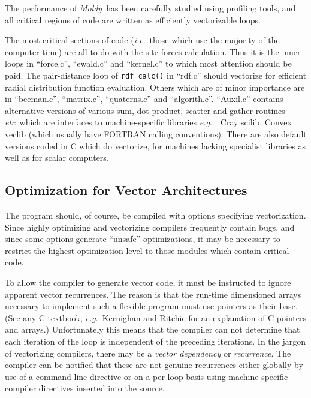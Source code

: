 \documentclass[twoside]{report}
\newcommand{\moldy}{{\em Moldy}}
\newcommand{\etc}{{\em etc}}
\newcommand{\eg}{{\em e.g}.\ }
\newcommand{\ie}{{\em i.e}.\ }
\begin{document}
The performance of \moldy\  has been carefully studied using profiling
tools, and all critical regions of code are written as efficiently
vectorizable loops.  

The most critical sections of code (\ie those which use the majority
of the computer time) are all to do with the site forces calculation.
Thus it is the inner loops in ``force.c'', ``ewald.c'' and
``kernel.c'' to which most attention should be paid.  The
pair-distance loop of \texttt{rdf\_calc()} in ``rdf.c'' should vectorize
for efficient radial distribution function evaluation. Others which
are of minor importance are in ``beeman.c'', ``matrix.c'',
``quaterns.c'' and ``algorith.c''.  ``Auxil.c'' contains alternative
versions of various sum, dot product, scatter and gather routines
\etc\ which are interfaces to machine-specific libraries \eg\
Cray scilib, Convex veclib (which usually have FORTRAN calling
conventions). There are also default versions coded in C which do
vectorize, for machines lacking specialist libraries as well as for
scalar computers.

\subsection{Optimization for Vector Architectures}
The program should, of course, be compiled with options specifying
vectorization.   Since highly
optimizing and vectorizing compilers frequently contain bugs, and
since some options generate ``unsafe'' optimizations, it may be
necessary to restrict the highest optimization level to those modules
which contain critical code.

To  allow  the compiler  to  generate   vector code, it must be
instructed to ignore apparent vector recurrences. The reason is
that the  run-time  dimensioned arrays necessary   to implement such a
flexible  program   must use   pointers as  their  base.    (See any C
textbook, \eg    Kernighan  and  Ritchie\cite{kernighan:78}    for  an
explanation of C pointers  and arrays.)  Unfortunately this means that
the  compiler  can not determine  that each iteration  of  the loop is
independent of the preceding iterations.  In the jargon of vectorizing
compilers, there may be a {\em vector dependency\/} or {\em
  recurrence}. The compiler can be notified that these are not genuine
recurrences either globally by use of a command-line directive or on a
per-loop basis using machine-specific compiler directives inserted into
the source.
\end{document}
